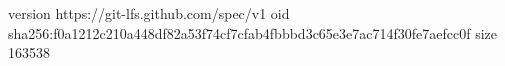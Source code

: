 version https://git-lfs.github.com/spec/v1
oid sha256:f0a1212c210a448df82a53f74cf7cfab4fbbbd3c65e3e7ac714f30fe7aefcc0f
size 163538
